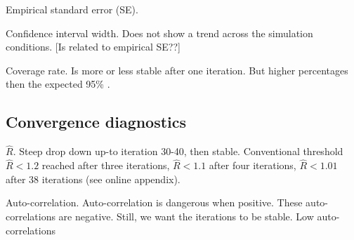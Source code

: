 \documentclass[article]{jss}
\begin{document}
Empirical standard error (SE).


Confidence interval width. Does not show a trend across the simulation conditions. [Is related to empirical SE??]


Coverage rate. Is more or less stable after one iteration. But higher percentages then the expected 95\% \cite{neym43}.

\subsection{Convergence diagnostics}

$\widehat{R}$. Steep drop down up-to iteration 30-40, then stable. Conventional threshold $\widehat{R} < 1.2$ reached after three iterations, $\widehat{R} < 1.1$ after four iterations, $\widehat{R} < 1.01$ after 38 iterations (see online appendix). 

Auto-correlation. Auto-correlation is dangerous when positive. These auto-correlations are negative. Still, we want the iterations to be stable. Low auto-correlations 
\end{document}
